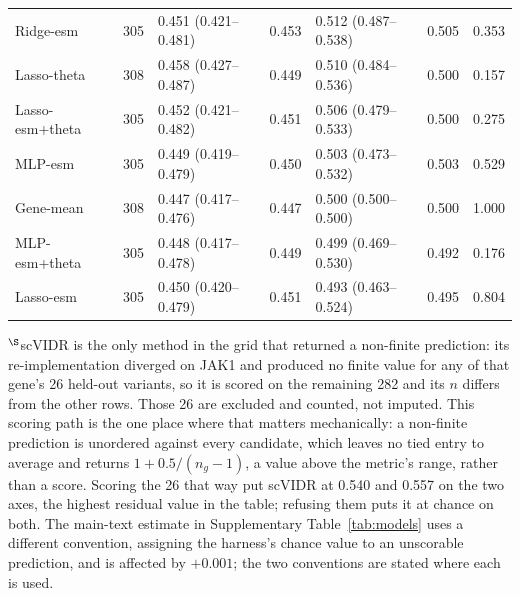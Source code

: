 \documentclass[11pt,letterpaper]{article}
\begin{document}
\begin{table}[H]
\begin{tabular}{@{}l r l r l r r@{}}
Ridge-esm & 305 & 0.451 (0.421--0.481) & 0.453 & 0.512 (0.487--0.538) & 0.505 & 0.353 \\
Lasso-theta & 308 & 0.458 (0.427--0.487) & 0.449 & 0.510 (0.484--0.536) & 0.500 & 0.157 \\
Lasso-esm+theta & 305 & 0.452 (0.421--0.482) & 0.451 & 0.506 (0.479--0.533) & 0.500 & 0.275 \\
MLP-esm & 305 & 0.449 (0.419--0.479) & 0.450 & 0.503 (0.473--0.532) & 0.503 & 0.529 \\
Gene-mean & 308 & 0.447 (0.417--0.476) & 0.447 & 0.500 (0.500--0.500) & 0.500 & 1.000 \\
MLP-esm+theta & 305 & 0.448 (0.417--0.478) & 0.449 & 0.499 (0.469--0.530) & 0.492 & 0.176 \\
Lasso-esm & 305 & 0.450 (0.420--0.479) & 0.451 & 0.493 (0.463--0.524) & 0.495 & 0.804 \\
\bottomrule
\end{tabular}

\smallskip
\footnotesize $^{\S}$scVIDR is the only method in the grid that returned a non-finite prediction: its re-implementation diverged on JAK1 and produced no finite value for any of that gene's 26 held-out variants, so it is scored on the remaining 282 and its $n$ differs from the other rows. Those 26 are excluded and counted, not imputed. This scoring path is the one place where that matters mechanically: a non-finite prediction is unordered against every candidate, which leaves no tied entry to average and returns $1+0.5/(n_g-1)$, a value above the metric's range, rather than a score. Scoring the 26 that way put scVIDR at 0.540 and 0.557 on the two axes, the highest residual value in the table; refusing them puts it at chance on both. The main-text estimate in Supplementary Table~\ref{tab:models} uses a different convention, assigning the harness's chance value to an unscorable prediction, and is affected by $+0.001$; the two conventions are stated where each is used.
\end{table}
\end{document}
